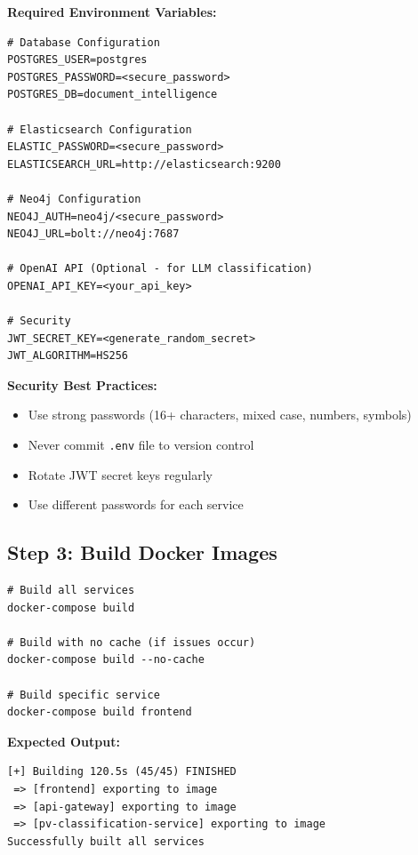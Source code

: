 \documentclass[11pt,a4paper,twoside]{book}
\begin{document}
\textbf{Required Environment Variables:}

\begin{lstlisting}[style=bashstyle]
# Database Configuration
POSTGRES_USER=postgres
POSTGRES_PASSWORD=<secure_password>
POSTGRES_DB=document_intelligence

# Elasticsearch Configuration
ELASTIC_PASSWORD=<secure_password>
ELASTICSEARCH_URL=http://elasticsearch:9200

# Neo4j Configuration
NEO4J_AUTH=neo4j/<secure_password>
NEO4J_URL=bolt://neo4j:7687

# OpenAI API (Optional - for LLM classification)
OPENAI_API_KEY=<your_api_key>

# Security
JWT_SECRET_KEY=<generate_random_secret>
JWT_ALGORITHM=HS256
\end{lstlisting}

\begin{warningbox}
\textbf{Security Best Practices:}
\begin{itemize}[noitemsep]
    \item Use strong passwords (16+ characters, mixed case, numbers, symbols)
    \item Never commit \texttt{.env} file to version control
    \item Rotate JWT secret keys regularly
    \item Use different passwords for each service
\end{itemize}
\end{warningbox}

\subsection{Step 3: Build Docker Images}

\begin{commandbox}
\begin{lstlisting}[style=bashstyle]
# Build all services
docker-compose build

# Build with no cache (if issues occur)
docker-compose build --no-cache

# Build specific service
docker-compose build frontend
\end{lstlisting}
\end{commandbox}

\textbf{Expected Output:}
\begin{lstlisting}[style=bashstyle]
[+] Building 120.5s (45/45) FINISHED
 => [frontend] exporting to image
 => [api-gateway] exporting to image
 => [pv-classification-service] exporting to image
Successfully built all services
\end{lstlisting}
\end{document}
